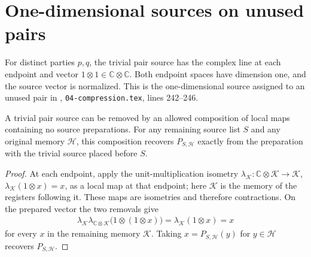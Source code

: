 \section{One-dimensional sources on unused pairs}
\label{sec:peps_unused_pair_sources}

\begin{definition}
    \label{def:peps_unit_pair_source}
    \leanok
    For distinct parties $p,q$, the trivial pair source has the complex line
    at each endpoint and vector $1\otimes 1\in\mathbb C\otimes\mathbb C$.
    Both endpoint spaces have dimension one, and the source vector is
    normalized. This is the one-dimensional source assigned to an unused
    pair in \cite[proof of Theorem~5.2]{OpenAI2026PolynomialPEPS},
    \texttt{04-compression.tex}, lines 242--246.
\end{definition}

\begin{lemma}
    \label{thm:peps_remove_unit_pair_source}
    \leanok
    A trivial pair source can be removed by an allowed composition of
    local maps containing no source preparations. For any remaining
    source list $S$ and any original memory $\mathcal H$, this composition
    recovers $P_{S,\mathcal H}$ exactly from the preparation with the
    trivial source placed before $S$.
\end{lemma}

\begin{proof}\leanok
    At each endpoint, apply the unit-multiplication isometry
    $\lambda_{\mathcal K}:\mathbb C\otimes\mathcal K\to\mathcal K$,
    $\lambda_{\mathcal K}(1\otimes x)=x$, as a local map at that endpoint;
    here $\mathcal K$ is the memory of the registers following it. These
    maps are isometries and therefore contractions. On the prepared vector
    the two removals give
    \begin{align*}
        \lambda_{\mathcal K}\lambda_{\mathbb C\otimes\mathcal K}
        \bigl(1\otimes(1\otimes x)\bigr)
        =\lambda_{\mathcal K}(1\otimes x)=x
    \end{align*}
    for every $x$ in the remaining memory $\mathcal K$. Taking
    $x=P_{S,\mathcal H}(y)$ for $y\in\mathcal H$ recovers
    $P_{S,\mathcal H}$.
\end{proof}

